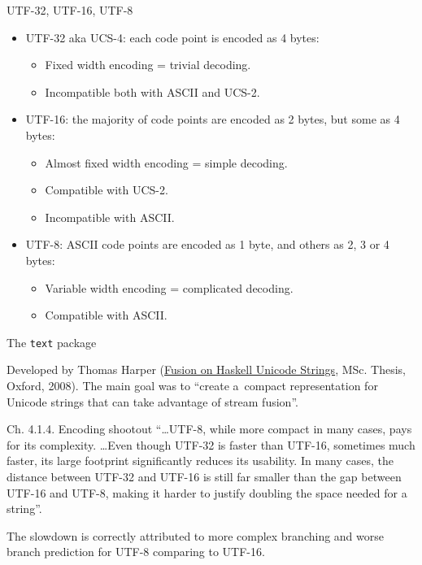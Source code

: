 \documentclass[handout]{beamer}
\begin{document}
\begin{frame}{UTF-32, UTF-16, UTF-8}

\begin{itemize}
\item UTF-32 aka UCS-4: each code point is encoded as 4 bytes:
  \begin{itemize}
  \item Fixed width encoding = trivial decoding.
  \item Incompatible both with ASCII and UCS-2.
  \end{itemize}
  \pause

\item UTF-16: the majority of code points are encoded as 2 bytes,
      but some
      as 4 bytes:
  \begin{itemize}
  \item Almost fixed width encoding = simple decoding.
  \item Compatible with UCS-2.
  \item Incompatible with ASCII.
  \end{itemize}
  \pause

\item UTF-8: ASCII code points are encoded as 1 byte,
      and others as 2, 3 or 4 bytes:
  \begin{itemize}
  \item Variable width encoding = complicated decoding.
  \item Compatible with ASCII.
  \end{itemize}

\end{itemize}

\end{frame}

\begin{frame}[fragile]{The {\tt text} package}

Developed by
  Thomas Harper
  (\href{https://www.cs.ox.ac.uk/files/3929/dissertation.pdf}{Fusion on Haskell Unicode Strings},
  MSc. Thesis, Oxford, 2008). The main goal was
  to ``create a~compact representation for Unicode strings that can take advantage
  of stream fusion''.

\medskip

\pause

\begin{block}{Ch. 4.1.4. Encoding shootout}
``\dots UTF-8, while more compact in many cases, pays for its complexity.
\dots Even though UTF-32 is faster
than UTF-16, sometimes much faster, its large footprint significantly reduces its usability. In
many cases, the distance between UTF-32 and UTF-16 is still far smaller than the gap between
UTF-16 and UTF-8, making it harder to justify doubling the space needed for a string''.
\end{block}

\medskip

\pause

The slowdown is correctly attributed to more complex branching
and worse branch prediction
for UTF-8 comparing to UTF-16.

\end{frame}
\end{document}

